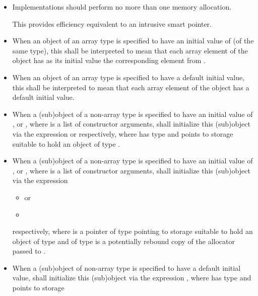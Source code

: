 \begin{itemdescr}
\pnum
\remarks
\begin{itemize}
\item
  Implementations should perform no more than one memory allocation.
  \begin{note}
  This provides efficiency equivalent to an intrusive smart pointer.
  \end{note}
\item
  When an object of an array type  is specified to have
  an initial value of  (of the same type),
  this shall be interpreted to mean that
  each array element of the object has as its initial value
  the corresponding element from .
\item
  When an object of an array type is specified to have
  a default initial value,
  this shall be interpreted to mean that each array element of the object
  has a default initial value.
\item
  When a (sub)object of a non-array type  is specified to have
  an initial value of , or ,
  where  is a list of constructor arguments,
   shall initialize this (sub)object
  via the expression  or  respectively,
  where  has type  and points to storage
  suitable to hold an object of type .
\item
  When a (sub)object of a non-array type  is specified to have
  an initial value of , or ,
  where  is a list of constructor arguments,
   shall initialize this (sub)object
  via the expression
  \begin{itemize}
  \item {} or
  \item {}
  \end{itemize}
  respectively,
  where  is a pointer of type 
  pointing to storage
  suitable to hold an object of type  and
   of type  is a potentially rebound copy of
  the allocator  passed to .
\item
  When a (sub)object of non-array type  is specified to have
  a default initial value,
   shall initialize this (sub)object
  via the expression ,
  where  has type  and points to storage

\end{itemize}
\end{itemdescr}
